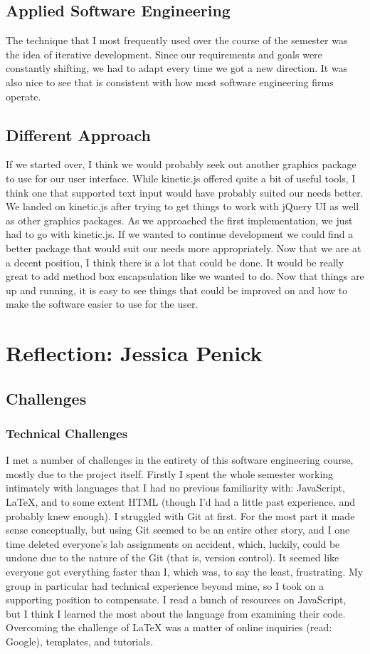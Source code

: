\documentclass[a4paper]{article}
\begin{document}
\subsection{Applied Software Engineering}
The technique that I most frequently used over the course of the semester was the idea of iterative development. Since our requirements and goals were constantly shifting, we had to adapt every time we got a new direction. It was also nice to see that is consistent with how most software engineering firms operate. 
\subsection{Different Approach}
If we started over, I think we would probably seek out another graphics package to use for our user interface. While kinetic.js offered quite a bit of useful tools, I think one that supported text input would have probably suited our needs better. We landed on kinetic.js after trying to get things to work with jQuery UI as well as other graphics packages. As we approached the first implementation, we just had to go with kinetic.js. If we wanted to continue development we could find a better package that would suit our needs more appropriately. Now that we are at a decent position, I think there is a lot that could be done. It would be really great to add method box encapsulation like we wanted to do. Now that things are up and running, it is easy to see things that could be improved on and how to make the software easier to use for the user. 
\section{Reflection: Jessica Penick}
\subsection{Challenges}
\subsubsection{Technical Challenges}
I met a number of challenges in the entirety of this software engineering course, mostly due to the project itself. Firstly I spent the whole semester working intimately with languages that I had no previous familiarity with: JavaScript, LaTeX, and to some extent HTML (though I'd had a little past experience, and probably knew enough). I struggled with Git at first. For the most part it made sense conceptually, but using Git seemed to be an entire other story, and I one time deleted everyone's lab assignments on accident, which, luckily, could be undone due to the nature of the Git (that is, version control). It seemed like everyone got everything faster than I, which was, to say the least, frustrating. My group in particular had technical experience beyond mine, so I took on a supporting position to compensate. I read a bunch of resources on JavaScript, but I think I learned the most about the language from examining their code. Overcoming the challenge of LaTeX was a matter of online inquiries (read: Google), templates, and tutorials.
\end{document}
